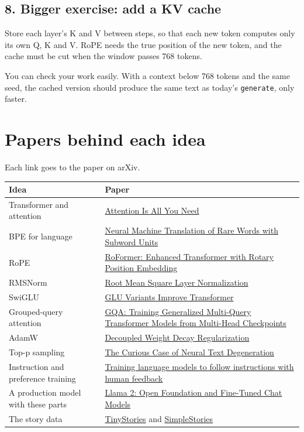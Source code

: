 \documentclass[11pt,a4paper]{article}
\newcommand{\code}[1]{\texttt{#1}}
\begin{document}
\subsection*{8. Bigger exercise: add a KV cache}
{}

Store each layer's K and V between steps, so that each new token computes only its own Q, K and V. RoPE needs the true position of the new token, and the cache must be cut when the window passes 768 tokens.

You can check your work easily. With a context below 768 tokens and the same seed, the cached version should produce the same text as today's \code{generate}, only faster.

\newpage

\section*{Papers behind each idea}
{}

Each link goes to the paper on arXiv.

{\small
\begin{longtable}{@{}>{\raggedright\arraybackslash}p{}>{\raggedright\arraybackslash}p{}@{}}
\toprule
\textbf{Idea} & \textbf{Paper} \\
\midrule
\endhead
Transformer and attention & \href{https://arxiv.org/abs/1706.03762}{Attention Is All You Need} \\
BPE for language & \href{https://arxiv.org/abs/1508.07909}{Neural Machine Translation of Rare Words with Subword Units} \\
RoPE & \href{https://arxiv.org/abs/2104.09864}{RoFormer: Enhanced Transformer with Rotary Position Embedding} \\
RMSNorm & \href{https://arxiv.org/abs/1910.07467}{Root Mean Square Layer Normalization} \\
SwiGLU & \href{https://arxiv.org/abs/2002.05202}{GLU Variants Improve Transformer} \\
Grouped-query attention & \href{https://arxiv.org/abs/2305.13245}{GQA: Training Generalized Multi-Query Transformer Models from Multi-Head Checkpoints} \\
AdamW & \href{https://arxiv.org/abs/1711.05101}{Decoupled Weight Decay Regularization} \\
Top-p sampling & \href{https://arxiv.org/abs/1904.09751}{The Curious Case of Neural Text Degeneration} \\
Instruction and preference training & \href{https://arxiv.org/abs/2203.02155}{Training language models to follow instructions with human feedback} \\
A production model with these parts & \href{https://arxiv.org/abs/2307.09288}{Llama 2: Open Foundation and Fine-Tuned Chat Models} \\
The story data & \href{https://arxiv.org/abs/2305.07759}{TinyStories} and \href{https://arxiv.org/abs/2504.09184}{SimpleStories} \\
\bottomrule
\end{longtable}
}
\end{document}
